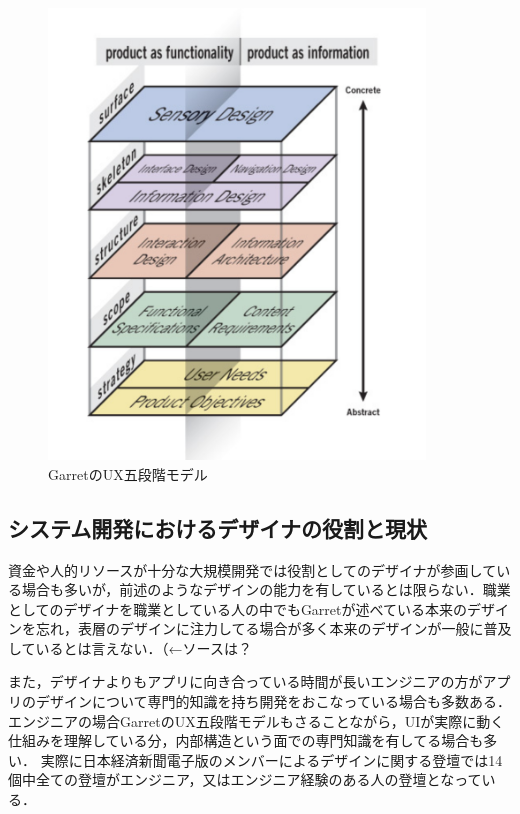 \begin{figure}[htbp]
  \begin{minipage}{\hsize}
    \begin{center}
       \includegraphics[width=100mm]{img/uxmodel.png}
    \end{center}
    \caption{GarretのUX五段階モデル\cite{garrett2010elements}}
    \label{fig:garretuxmodel}
  \end{minipage}
\end{figure}

\subsection{システム開発におけるデザイナの役割と現状}


資金や人的リソースが十分な大規模開発では役割としてのデザイナが参画している場合も多いが，前述のようなデザインの能力を有しているとは限らない．職業としてのデザイナを職業としている人の中でもGarretが述べている本来のデザインを忘れ，表層のデザインに注力してる場合が多く本来のデザインが一般に普及しているとは言えない．（←ソースは？

また，デザイナよりもアプリに向き合っている時間が長いエンジニアの方がアプリのデザインについて専門的知識を持ち開発をおこなっている場合も多数ある．エンジニアの場合GarretのUX五段階モデルもさることながら，UIが実際に動く仕組みを理解している分，内部構造という面での専門知識を有してる場合も多い．
実際に日本経済新聞電子版のメンバーによるデザインに関する登壇では14個中全ての登壇がエンジニア，又はエンジニア経験のある人の登壇となっている．\cite{nikkeislide}

